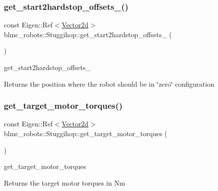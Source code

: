 \subsubsection{\texorpdfstring{get\+\_\+start2hardstop\+\_\+offsets\+\_\+()}{get\_start2hardstop\_offsets\_()}}
{\footnotesize\ttfamily const Eigen\+::\+Ref$<$\hyperlink{common__header_8hpp_acb6916bc8c9fe9d98c484fd4cc201447}{Vector2d}$>$ blmc\+\_\+robots\+::\+Stuggihop\+::get\+\_\+start2hardstop\+\_\+offsets\+\_\+ (\begin{DoxyParamCaption}{ }\end{DoxyParamCaption})\hspace{0.3cm}{\ttfamily [inline]}}



get\+\_\+start2hardstop\+\_\+offsets\+\_\+ 

\begin{DoxyReturn}{Returns}
the position where the robot should be in \char`\"{}zero\char`\"{} configuration 
\end{DoxyReturn}
\mbox{\label{classblmc__robots_1_1Stuggihop_aa37d49ec5e4fb52bac480aa552fc4546}} 
\subsubsection{\texorpdfstring{get\+\_\+target\+\_\+motor\+\_\+torques()}{get\_target\_motor\_torques()}}
{\footnotesize\ttfamily const Eigen\+::\+Ref$<$\hyperlink{common__header_8hpp_acb6916bc8c9fe9d98c484fd4cc201447}{Vector2d}$>$ blmc\+\_\+robots\+::\+Stuggihop\+::get\+\_\+target\+\_\+motor\+\_\+torques (\begin{DoxyParamCaption}{ }\end{DoxyParamCaption})\hspace{0.3cm}{\ttfamily [inline]}}



get\+\_\+target\+\_\+motor\+\_\+torques 

\begin{DoxyReturn}{Returns}
the target motor torques in Nm 
\end{DoxyReturn}
\mbox{\label{classblmc__robots_1_1Stuggihop_a5f0707d8965fc98b36ca3fa42b57db5f}} 
